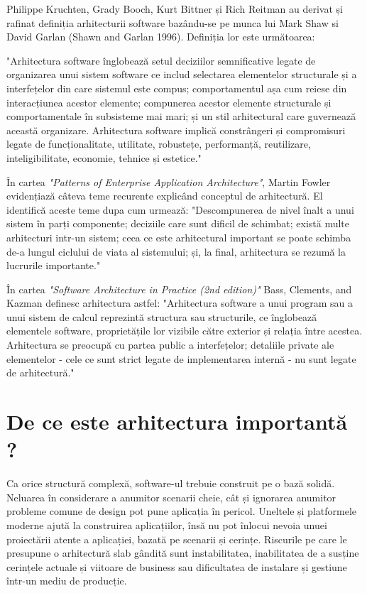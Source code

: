 \documentclass[12pt, a4paper, oneside, romanian]{teza-upb}
\begin{document}
Philippe Kruchten, Grady Booch, Kurt Bittner și Rich Reitman au derivat și rafinat definiția arhitecturii software bazându-se pe munca lui Mark Shaw si David Garlan (Shawn and Garlan 1996). Definiția lor este următoarea:

"Arhitectura software înglobează setul deciziilor semnificative legate de organizarea unui sistem software ce includ selectarea elementelor structurale și a interfețelor din care sistemul este compus; comportamentul așa cum reiese din interacțiunea acestor elemente; compunerea acestor elemente structurale și comportamentale în subsisteme mai mari; și un stil arhitectural care guvernează această organizare. Arhitectura software implică constrângeri și compromisuri legate de funcționalitate, utilitate, robustețe, performanță, reutilizare, inteligibilitate, economie, tehnice și estetice."

În cartea \emph{"Patterns of Enterprise Application Architecture"}, Martin Fowler evidențiază câteva teme recurente explicând conceptul de arhitectură. El identifică aceste teme dupa cum urmează: "Descompunerea de nivel înalt a unui sistem în parți componente; deciziile care sunt dificil de schimbat; există multe arhitecturi intr-un sistem; ceea ce este arhitectural important se poate schimba de-a lungul ciclului de viata al sistemului; și, la final, arhitectura se rezumă la lucrurile importante."

În cartea \emph{"Software Architecture in Practice (2nd edition)"} Bass, Clements, and Kazman definesc arhitectura astfel: "Arhitectura software a unui program sau a unui sistem de calcul reprezintă structura sau structurile, ce înglobează elementele software, proprietățile lor vizibile către exterior și relația între acestea. Arhitectura se preocupă cu partea public a interfețelor; detaliile private ale elementelor - cele ce sunt strict legate de implementarea internă - nu sunt legate de arhitectură."

\newpage
\section{De ce este arhitectura importantă ?}
Ca orice structură complexă, software-ul trebuie construit pe o bază solidă. Neluarea în considerare a anumitor scenarii cheie, cât și ignorarea anumitor probleme comune de design pot pune aplicația în pericol. Uneltele și platformele moderne ajută la construirea aplicațiilor, însă nu pot înlocui nevoia unuei proiectării atente a aplicației, bazată pe scenarii și cerințe. Riscurile pe care le presupune o arhitectură slab gândită sunt instabilitatea, inabilitatea de a susține cerințele actuale și viitoare de business sau dificultatea de instalare și gestiune într-un mediu de producție.
\end{document}
